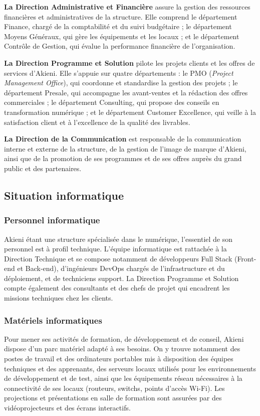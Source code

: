 \textbf{La Direction Administrative et Financière} assure la gestion des ressources financières et administratives de la structure. Elle comprend le département Finance, chargé de la comptabilité et du suivi budgétaire ; le département Moyens Généraux, qui gère les équipements et les locaux ; et le département Contrôle de Gestion, qui évalue la performance financière de l'organisation.

\textbf{La Direction Programme et Solution} pilote les projets clients et les offres de services d'Akieni. Elle s'appuie sur quatre départements : le PMO (\textit{Project Management Office}), qui coordonne et standardise la gestion des projets ; le département Presale, qui accompagne les avant-ventes et la rédaction des offres commerciales ; le département Consulting, qui propose des conseils en transformation numérique ; et le département Customer Excellence, qui veille à la satisfaction client et à l'excellence de la qualité des livrables.

\textbf{La Direction de la Communication} est responsable de la communication interne et externe de la structure, de la gestion de l'image de marque d'Akieni, ainsi que de la promotion de ses programmes et de ses offres auprès du grand public et des partenaires.

\subsection{Situation informatique}

\subsubsection{Personnel informatique}

Akieni étant une structure spécialisée dans le numérique, l'essentiel de son personnel est à profil technique. L'équipe informatique est rattachée à la Direction Technique et se compose notamment de développeurs Full Stack (Front-end et Back-end), d'ingénieurs DevOps chargés de l'infrastructure et du déploiement, et de techniciens support. La Direction Programme et Solution compte également des consultants et des chefs de projet qui encadrent les missions techniques chez les clients.

\subsubsection{Matériels informatiques}

Pour mener ses activités de formation, de développement et de conseil, Akieni dispose d'un parc matériel adapté à ses besoins. On y trouve notamment des postes de travail et des ordinateurs portables mis à disposition des équipes techniques et des apprenants, des serveurs locaux utilisés pour les environnements de développement et de test, ainsi que les équipements réseau nécessaires à la connectivité de ses locaux (routeurs, switchs, points d'accès Wi-Fi). Les projections et présentations en salle de formation sont assurées par des vidéoprojecteurs et des écrans interactifs.

